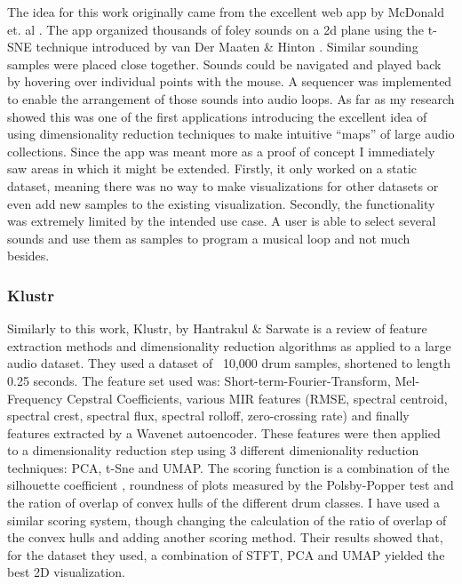 \documentclass[11pt]{article}
\begin{document}
The idea for this work originally came from the excellent web app by McDonald et. al \cite{inf_drum_machine}. The app organized thousands of foley sounds on a 2d plane using the t-SNE technique introduced by van Der Maaten \& Hinton \cite{tsne}. Similar sounding samples were placed close together. Sounds could be navigated and played back by hovering over individual points with the mouse. A sequencer was implemented to enable the arrangement of those sounds into audio loops. As far as my research showed this was one of the first applications introducing the excellent idea of using dimensionality reduction techniques to make intuitive ``maps'' of large audio collections. Since the app was meant more as a proof of concept I immediately saw areas in which it might be extended. Firstly, it only worked on a static dataset, meaning there was no way to make visualizations for other datasets or even add new samples to the existing visualization. Secondly, the functionality was extremely limited by the intended use case. A user is able to select several sounds and use them as samples to program a musical loop and not much besides.
\subsubsection{Klustr}
\label{sec:org02aa748}

Similarly to this work, Klustr, by Hantrakul \& Sarwate \cite{klustr} is a review of feature extraction methods and dimensionality reduction algorithms as applied to a large audio dataset. They used a dataset of ~10,000 drum samples, shortened to length 0.25 seconds. The feature set used was: Short-term-Fourier-Transform, Mel-Frequency Cepstral Coefficients, various MIR features (RMSE, spectral centroid, spectral crest, spectral flux, spectral rolloff, zero-crossing rate) and finally features extracted by a Wavenet autoencoder. These features were then applied to a dimensionality reduction step using 3 different dimenionality reduction techniques: PCA, t-Sne and UMAP. The scoring function is a combination of the silhouette coefficient \cite{silhouette}, roundness of plots measured by the Polsby-Popper test \cite{popper} and the ration of overlap of convex hulls of the different drum classes. I have used a similar scoring system, though changing the calculation of the ratio of overlap of the convex hulls and adding another scoring method. Their results showed that, for the dataset they used, a combination of STFT, PCA and UMAP yielded the best 2D visualization.
\end{document}
